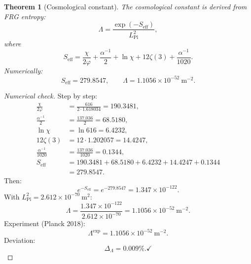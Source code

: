 \documentclass[11pt,a4paper]{article}
\newtheorem{theorem}{Theorem}[section]
\theoremstyle{definition}
\begin{document}
\begin{theorem}[Cosmological constant]
\label{thm:lambda}
The cosmological constant is derived from FRG entropy:
\begin{equation}
    \boxed{
    \Lambda = \frac{\exp(-S_{\text{eff}})}{L_{\text{Pl}}^2},
    }
    \label{eq:lambda-formula}
\end{equation}
where
\begin{equation}
    S_{\text{eff}} = \frac{\chi}{2\varphi} 
    + \frac{\alpha^{-1}}{2} + \ln \chi 
    + 12 \zeta(3) + \frac{\alpha^{-1}}{1020}.
    \label{eq:s-eff}
\end{equation}
Numerically:
\begin{equation}
    S_{\text{eff}} = 279.8547, \qquad 
    \Lambda = 1.1056 \times 10^{-52}~\text{m}^{-2}.
\end{equation}
\end{theorem}

\begin{proof}[Numerical check]
Step by step:
\begin{align}
    \frac{\chi}{2\varphi} &= \frac{616}{2 \cdot 1.618034} 
                          = 190.3481, \\
    \frac{\alpha^{-1}}{2} &= \frac{137.036}{2} = 68.5180, \\
    \ln \chi &= \ln 616 = 6.4232, \\
    12 \zeta(3) &= 12 \cdot 1.202057 = 14.4247, \\
    \frac{\alpha^{-1}}{1020} &= \frac{137.036}{1020} = 0.1344, \\
    S_{\text{eff}} &= 190.3481 + 68.5180 + 6.4232 + 14.4247 + 0.1344 \\
                   &= 279.8547.
\end{align}
Then:
\begin{equation}
    e^{-S_{\text{eff}}} = e^{-279.8547} = 1.347 \times 10^{-122}.
\end{equation}
With $L_{\text{Pl}}^2 = 2.612 \times 10^{-70}~\text{m}^2$:
\begin{equation}
    \Lambda = \frac{1.347 \times 10^{-122}}{2.612 \times 10^{-70}} 
    = 1.1056 \times 10^{-52}~\text{m}^{-2}.
\end{equation}
Experiment (Planck 2018):
\begin{equation}
    \Lambda^{\text{exp}} = 1.1056 \times 10^{-52}~\text{m}^{-2}.
\end{equation}
Deviation:
\begin{equation}
    \Delta_\Lambda = \mathbf{0.009\%}. \checkmark
\end{equation}
\end{proof}
\end{document}
